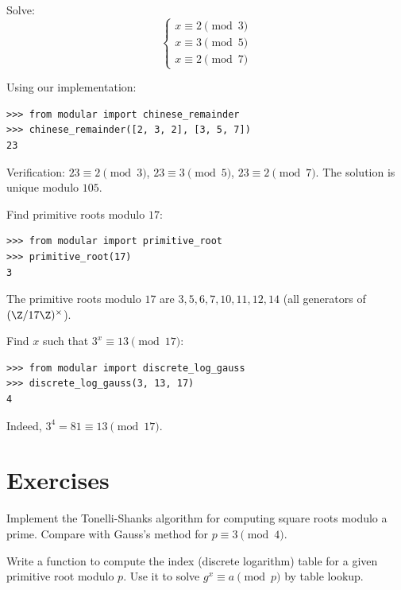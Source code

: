 \begin{example}
Solve:
\[
\begin{cases}
x \equiv 2 \pmod{3} \\
x \equiv 3 \pmod{5} \\
x \equiv 2 \pmod{7}
\end{cases}
\]

Using our implementation:
\begin{lstlisting}[style=python]
>>> from modular import chinese_remainder
>>> chinese_remainder([2, 3, 2], [3, 5, 7])
23
\end{lstlisting}

Verification: $23 \equiv 2 \pmod{3}$, $23 \equiv 3 \pmod{5}$, $23 \equiv 2 \pmod{7}$. The solution is unique modulo $105$.
\end{example}

\begin{example}
Find primitive roots modulo $17$:
\begin{lstlisting}[style=python]
>>> from modular import primitive_root
>>> primitive_root(17)
3
\end{lstlisting}
The primitive roots modulo $17$ are $3, 5, 6, 7, 10, 11, 12, 14$ (all generators of $(\Z/17\Z)^\times$).
\end{example}

\begin{example}
Find $x$ such that $3^x \equiv 13 \pmod{17}$:
\begin{lstlisting}[style=python]
>>> from modular import discrete_log_gauss
>>> discrete_log_gauss(3, 13, 17)
4
\end{lstlisting}
Indeed, $3^4 = 81 \equiv 13 \pmod{17}$.
\end{example}

\section{Exercises}

\begin{exercise}
Implement the Tonelli-Shanks algorithm for computing square roots modulo a prime. Compare with Gauss's method for $p \equiv 3 \pmod{4}$.
\end{exercise}

\begin{exercise}
Write a function to compute the index (discrete logarithm) table for a given primitive root modulo $p$. Use it to solve $g^x \equiv a \pmod{p}$ by table lookup.
\end{exercise}

